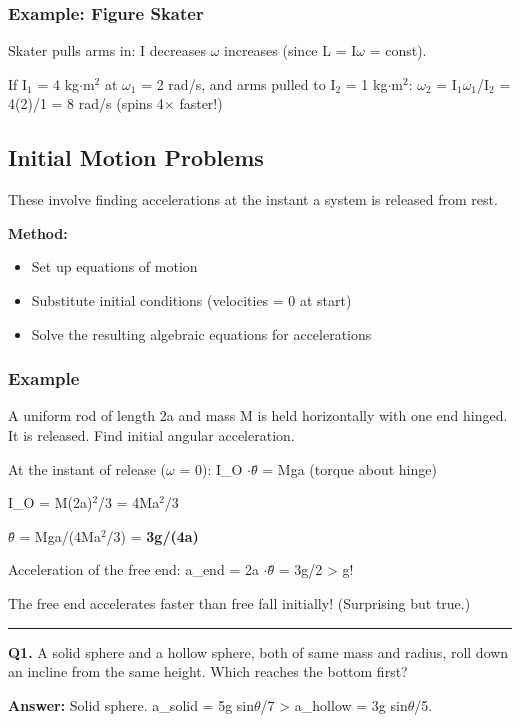 \documentclass[12pt,a4paper,openany]{book}
\begin{document}
{{\subsubsection{Example: Figure Skater}
Skater pulls arms in: I decreases  $\omega$ increases (since L = I$\omega$ = const).

If I$_1$ = 4 kg$\cdot$m$^2$ at $\omega_1$ = 2 rad/s, and arms pulled to I$_2$ = 1 kg$\cdot$m$^2$:
$\omega_2$ = I$_1\omega_1$/I$_2$ = 4(2)/1 = 8 rad/s (spins 4$\times$ faster!)

\subsection{Initial Motion Problems}

These involve finding accelerations at the instant a system is released from rest.

\textbf{Method:}
\begin{itemize}
  \item Set up equations of motion
  \item Substitute initial conditions (velocities = 0 at start)
  \item Solve the resulting algebraic equations for accelerations
\end{itemize}

\subsubsection{Example}
A uniform rod of length 2a and mass M is held horizontally with one end hinged. It is released. Find initial angular acceleration.

At the instant of release ($\omega$ = 0):
I_O $\cdot\theta$̈ = Mga (torque about hinge)

I_O = M(2a)$^2$/3 = 4Ma$^2$/3

$\theta$̈ = Mga/(4Ma$^2$/3) = \textbf{3g/(4a)}

Acceleration of the free end: a_end = 2a $\cdot\theta$̈ = 3g/2 > g!

The free end accelerates faster than free fall initially! (Surprising but true.)

\bigskip\noindent\rule{\textwidth}{0.4pt}\bigskip


\textbf{Q1.} A solid sphere and a hollow sphere, both of same mass and radius, roll down an incline from the same height. Which reaches the bottom first?

\textbf{Answer:} Solid sphere. a_solid = 5g sin$\theta$/7 > a_hollow = 3g sin$\theta$/5.

}}
\end{document}
